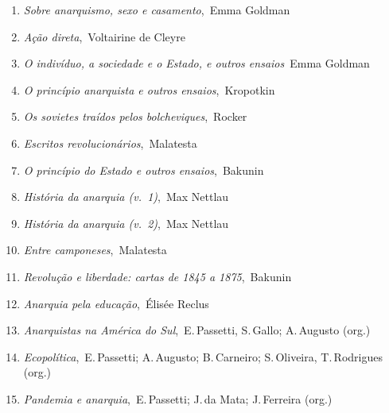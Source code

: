 \begin{enumerate}
\setlength{\topsep}{2pt}
\setlength{\partopsep}{0pt}
\setlength\parskip{4.2pt}
\setlength\itemsep{-1.4mm}
\item \textit{Sobre anarquismo, sexo e casamento},\, Emma Goldman
\item \textit{Ação direta},\, Voltairine de Cleyre
\item \textit{O indivíduo, a sociedade e o Estado, e outros ensaios}\, Emma Goldman
\item \textit{O princípio anarquista e outros ensaios},\, Kropotkin
\item \textit{Os sovietes traídos pelos bolcheviques},\, Rocker
\item \textit{Escritos revolucionários},\, Malatesta
\item \textit{O princípio do Estado e outros ensaios},\, Bakunin
\item \textit{História da anarquia (v.~1)},\, Max Nettlau
\item \textit{História da anarquia (v.~2)},\, Max Nettlau
\item \textit{Entre camponeses},\, Malatesta
\item \textit{Revolução e liberdade: cartas de 1845 a 1875},\, Bakunin
\item \textit{Anarquia pela educação},\, Élisée Reclus
\item \textit{Anarquistas na América do Sul},\, E.\,Passetti, S.\,Gallo; A.\,Augusto  (org.)
\item \textit{Ecopolítica},\, E.\,Passetti; A.\,Augusto; B.\,Carneiro; S.\,Oliveira, T.\,Rodrigues  (org.)
\item \textit{Pandemia e anarquia},\, E.\,Passetti; J.\,da Mata; J.\,Ferreira  (org.)
\end{enumerate}

\vspace{-5mm}






\endgroup %
\nopagecolor
\color{black}